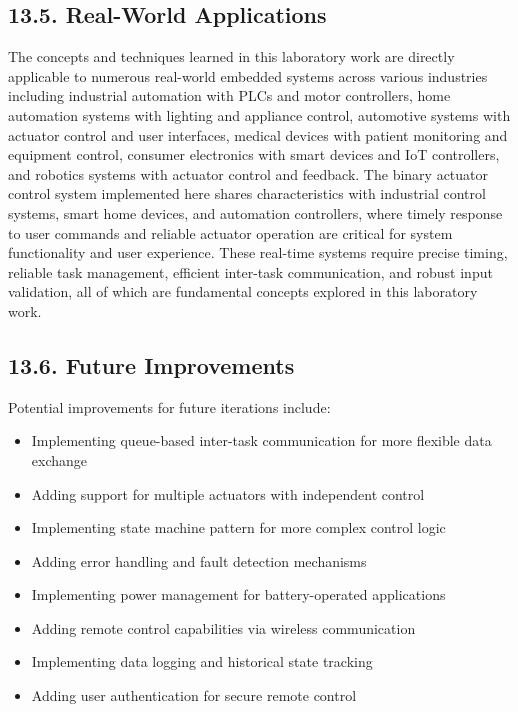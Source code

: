 \documentclass[12pt]{article}
\begin{document}
\subsection*{13.5. Real-World Applications}

The concepts and techniques learned in this laboratory work are directly applicable to numerous real-world embedded systems across various industries including industrial automation with PLCs and motor controllers, home automation systems with lighting and appliance control, automotive systems with actuator control and user interfaces, medical devices with patient monitoring and equipment control, consumer electronics with smart devices and IoT controllers, and robotics systems with actuator control and feedback. The binary actuator control system implemented here shares characteristics with industrial control systems, smart home devices, and automation controllers, where timely response to user commands and reliable actuator operation are critical for system functionality and user experience. These real-time systems require precise timing, reliable task management, efficient inter-task communication, and robust input validation, all of which are fundamental concepts explored in this laboratory work.

\subsection*{13.6. Future Improvements}

Potential improvements for future iterations include:

\begin{itemize}
    \item Implementing queue-based inter-task communication for more flexible data exchange
    \item Adding support for multiple actuators with independent control
    \item Implementing state machine pattern for more complex control logic
    \item Adding error handling and fault detection mechanisms
    \item Implementing power management for battery-operated applications
    \item Adding remote control capabilities via wireless communication
    \item Implementing data logging and historical state tracking
    \item Adding user authentication for secure remote control
\end{itemize}
\end{document}
